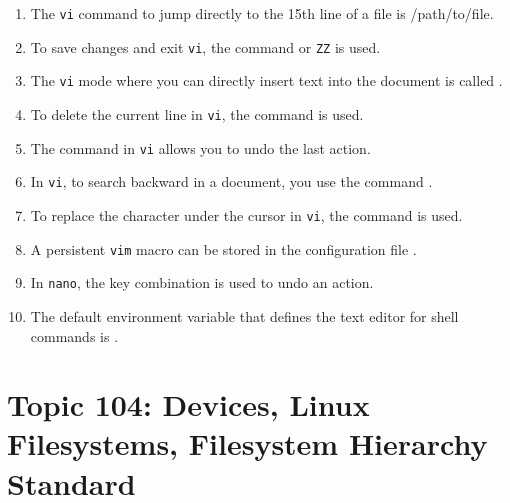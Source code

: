 \documentclass[a4paper]{report}
\begin{document}
\begin{enumerate}[1.]
\item The \texttt{vi} command to jump directly to the 15th line of a file is \underline{\hspace{2cm}} /path/to/file.

\item To save changes and exit \texttt{vi}, the command \underline{\hspace{2cm}} or \texttt{ZZ} is used.

\item The \texttt{vi} mode where you can directly insert text into the document is called \underline{\hspace{2cm}}.

\item To delete the current line in \texttt{vi}, the command \underline{\hspace{2cm}} is used.

\item The \underline{\hspace{2cm}} command in \texttt{vi} allows you to undo the last action.

\item In \texttt{vi}, to search backward in a document, you use the command \underline{\hspace{2cm}}.

\item To replace the character under the cursor in \texttt{vi}, the \underline{\hspace{2cm}} command is used.

\item A persistent \texttt{vim} macro can be stored in the configuration file \underline{\hspace{2cm}}.

\item In \texttt{nano}, the key combination \underline{\hspace{2cm}} is used to undo an action.

\item The default environment variable that defines the text editor for shell commands is \underline{\hspace{2cm}}.
\end{enumerate}

\newpage
\chapter{Topic 104: Devices, Linux Filesystems, Filesystem Hierarchy Standard}
\end{document}
